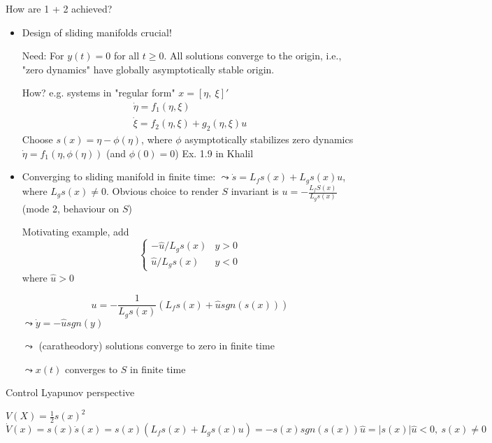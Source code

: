 
How are 1 + 2 achieved?
\begin{itemize}
\item Design of sliding manifolds crucial!

Need: For $y(t)=0$ for all $t \geq 0$. All solutions converge to the origin, i.e., "zero dynamics" have globally asymptotically stable origin.

How? e.g. systems in "regular form"
$x = \left[ \eta, \ \xi \right]'$ 
\begin{equation*}
\begin{array}{l}
     \dot{\eta} = f_1(\eta, \xi)\\
     \dot{\xi} = f_2(\eta, \xi) + g_2(\eta,\xi) u
\end{array}
\end{equation*}
Choose $s(x)=\eta - \phi(\eta)$, where $\phi$ asymptotically stabilizes zero dynamics $\dot{\eta} = f_1(\eta, \phi(\eta))$ (and $\phi(0) = 0$)
Ex. 1.9 in Khalil
\item Converging to sliding manifold in finite time:
$\leadsto \dot{s} = L_fs(x) + L_gs(x)u$, where $L_gs(x) \neq 0$. Obvious choice to render $S$ invariant is $u = - \frac{L_fS(x)}{L_gs(x)}$ (mode 2, behaviour on $S$)

Motivating example, add 
\begin{equation*}
\left \{ \begin{array}{ll}
     - \hat{u}/ L_gs(x) & y > 0 \\
     \hat{u} /L_gs(x) & y < 0
\end{array} \right.
\end{equation*}
where $\hat{u} > 0$

\begin{equation*}
 u = - \frac{1}{L_gs(x)}(L_fs(x) + \hat{u}sgn(s(x)))
\end{equation*}
$\leadsto \dot{y} = - \hat{u} sgn(y)$

$\leadsto $ (caratheodory) solutions converge to zero in finite time

$\leadsto x(t)$ converges to $S$ in finite time
\end{itemize}

Control Lyapunov perspective

$V(X) = \frac{1}{2}s(x)^2$
\begin{equation*}
\dot{V}(x) = s(x) \dot{s}(x) = s(x)(L_fs(x)+L_gs(x)u) = -s(x)sgn(s(x))\hat{u} = | s(x)|\hat{u} < 0,\ s(x) \neq 0
\end{equation*}

